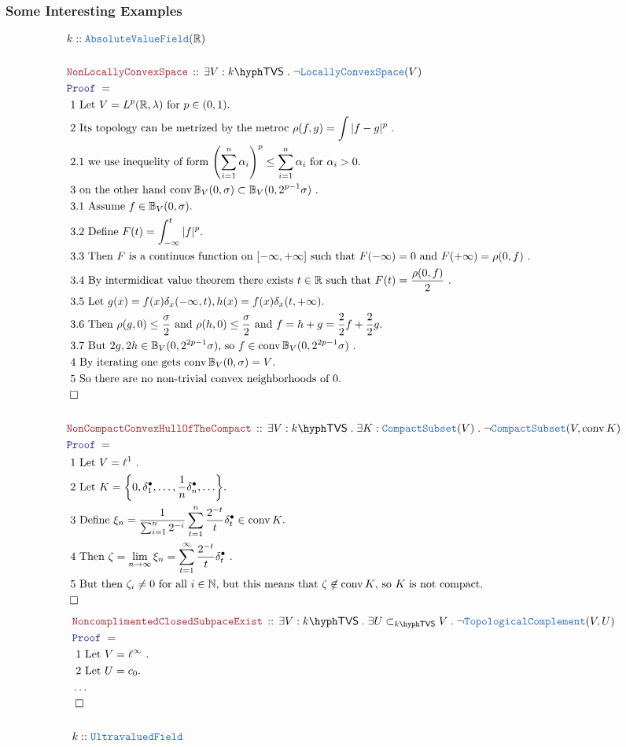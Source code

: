 \documentclass[12pt]{scrartcl}
\newcommand{\TYPE}[1]{\textcolor{NavyBlue}{\mathtt{#1}}}
\newcommand{\LOGIC}[1]{\textcolor{Blue}{\mathtt{#1}}}
\newcommand{\THM}[1]{\textcolor{Maroon}{\mathtt{#1}}}
\renewcommand{\.}{\; . \;}
\newcommand{\Theorem}[2]{& \THM{#1} \, :: \, #2 \\ & \Proof = \\ }
\newcommand{\Page}[1]{ \begin{align*} #1 \end{align*}   }
\newcommand{\NoProof}{ & \ldots \\ \EndProof}
\newcommand{\Explain}[1]{& \text{#1.} \\}
\newcommand{\Reals}{\mathbb{R} }
\newcommand{\Nat}{\mathbb{N} }
\newcommand{\QED}{\; \square}
\newcommand{\EndProof}{& \QED \\}
\newcommand{\Proof}{\LOGIC{Proof} \; }
\newcommand{\Compacts}{\TYPE{CompactSubset}}
\newcommand{\Cell}{\mathbb{B}}
\DeclareMathOperator{\conv}{conv}
\newcommand{\AVF}{\TYPE{AbsoluteValueField}}
\newcommand{\LConv}{\TYPE{LocallyConvexSpace}}
\newcommand{\TC}{\TYPE{TopologicalComplement}}
\newcommand{\TVS}[1]{{#1}\hyph\mathsf{TVS}}
\begin{document}
\subsubsection{Some Interesting Examples}
\Page{
	& k :: \AVF(\Reals) \\
	\\
	\Theorem{NonLocallyConvexSpace}{
		\exists V : \TVS{k} \.  
		\neg\LConv(V)
	}
	\Explain{ 1 Let $V = L^p(\Reals,\lambda)$ for $p \in (0,1)$}
	\Explain{ 2 Its topology can be metrized by the metroc $\rho(f,g) = \int |f- g|^p$  }
	\Explain{ 2.1 we use inequelity of form 
		$\left( \sum^n_{i=1} \alpha_i \right)^p \le \sum^n_{i=1} \alpha_i$
			for 	$\alpha_i > 0$}
	\Explain{ 3 on the other hand $\conv \Cell_V(0,\sigma) \subset \Cell_V(0,2^{p-1}\sigma)$ }
	\Explain{ 3.1 Assume $f \in \Cell_V(0,\sigma)$}
	\Explain{ 3.2 Define $F(t) = \int_{-\infty}^t |f|^p$}
	\Explain{ 3.3 Then $F$ is a continuos function on $[-\infty,+\infty]$ 
		such that $F(-\infty) = 0$ and $F(+\infty) = \rho(0,f)$ }
	\Explain{ 3.4 By intermidieat value theorem there exists $t \in \Reals$
		such that $F(t) = \frac{\rho(0,f)}{2}$
	}
	\Explain{ 3.5 Let $g(x) = f(x)\delta_x(-\infty,t), h(x) = f(x)\delta_x(t,+\infty)$}
	\Explain{ 3.6 Then  $\rho(g,0) \le \frac{\sigma}{2}$ and  $\rho(h,0) \le \frac{\sigma}{2}$
		and $f = h + g = \frac{2}{2}f + \frac{2}{2}g$}
	\Explain{ 3.7 But $2g,2h \in \Cell_V(0,2^{2p-1}\sigma)$, so $f \in \conv \Cell_V(0,2^{2p-1}\sigma)$ }
	\Explain{ 4 By iterating one gets $\conv \Cell_V(0,\sigma) = V$}
	\Explain{ 5 So there are no non-trivial convex neighborhoods of $0$}
	\EndProof
	\\
	\Theorem{NonCompactConvexHullOfTheCompact}
	{
		\exists V  : \TVS{k} \.
		\exists K : \Compacts(V) \.
		\neg \Compacts(V, \conv K)
	}
	\Explain{ 1 Let $V = \ell^1$ }
	\Explain{ 2 Let $K = \left\{0, \delta_1^\bullet,\ldots, \frac{1}{n} \delta_{n}^\bullet  ,\ldots \right\}$}
	\Explain{ 3 Define $\xi_n = 
		\frac{1}{\sum^n_{i=1} 2^{-i}  } \sum^n_{t=1} \frac{2^{-t}}{t} \delta_{t}^\bullet
			\in \conv K$}
	\Explain{ 4 Then $\zeta = 
		\lim_{n \to \infty} \xi_n =  \sum^\infty_{t=1} \frac{2^{-t}}{t} \delta_{t}^\bullet$
	}
	\Explain{ 5 But then $\zeta_i \neq 0$ for all $i \in \Nat$,
		but this means that $\zeta \not \in \conv K$, so $K$ is not compact}
	\EndProof
}\Page{
	\Theorem{NoncomplimentedClosedSubpaceExist}
	{
		\exists V : \TVS{k} \.
		\exists U \subset_{\TVS{k}} V \.
		\neg  \TC(V,U)
	}
	\Explain{ 1 Let $V = \ell^\infty$ }
	\Explain{ 2 Let $U = c_0$}
	\NoProof
	\\
	& k :: \TYPE{UltravaluedField} \\
}
\end{document}
